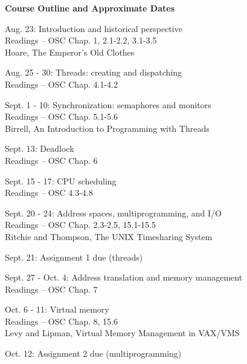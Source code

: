 \begin{center}
{\large {\bf Course Outline and Approximate Dates}}
\end{center}

\begin{description}

\item{Aug. 23:} Introduction and historical perspective\\
  Readings -- OSC Chap. 1, 2.1-2.2, 3.1-3.5\\
  Hoare, The Emperor's Old Clothes

\item{Aug. 25 - 30:} Threads: creating and dispatching\\
  Readings -- OSC Chap. 4.1-4.2

\item{Sept. 1 - 10:} Synchronization: semaphores and monitors\\
  Readings -- OSC Chap. 5.1-5.6\\
  Birrell, An Introduction to Programming with Threads

\item{Sept. 13:} Deadlock\\
  Readings -- OSC Chap. 6

\item{Sept. 15 - 17:} CPU scheduling\\
  Readings -- OSC 4.3-4.8

\item{Sept. 20 - 24:} Address spaces, multiprogramming, and I/O\\
  Readings -- OSC Chap. 2.3-2.5, 15.1-15.5\\
  Ritchie and Thompson, The UNIX Timesharing System

\item{Sept. 21:} Assignment 1 due (threads)

\item{Sept. 27 - Oct. 4:} Address translation and memory management\\
  Readings -- OSC Chap. 7

\item{Oct. 6 - 11:} Virtual memory\\
  Readings -- OSC Chap. 8, 15.6\\
  Levy and Lipman, Virtual Memory Management in VAX/VMS 

\item{Oct. 12:} Assignment 2 due (multiprogramming)


\end{description}
